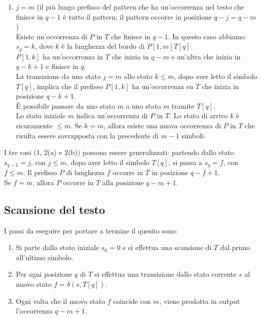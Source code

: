\begin{enumerate}
\begin{enumerate}
        \item $j = m$	(il più lungo prefisso del pattern che ha un’occorrenza nel testo che finisce in $q-1$ è tutto il pattern; il pattern occorre in posizione $q-j = q-m$)\\
        Esiste un’occorrenza di $P$ in $T$ che finisce in $q-1$. In questo caso abbiamo $s_q = k$, dove $k$ è la lunghezza del bordo di $P[1,m]T[q]$\\
        $P[1,k]$ ha un’occorrenza in $T$ che inizia in $q-m$ e un’altra che inizia in $q-k+1$ e finisce in $q$. \\
        La transizione da uno stato $j=m$ allo stato $k \leq m$, dopo aver letto il simbolo $T[q]$, implica che il prefisso $P[1,k]$ ha un’occorrenza su $T$ che inizia in posizione $q-k+1$.\\
        
        È possibile passare da uno stato $m$ a uno stato $m$ tramite $T[q]$.\\
        Lo stato iniziale $m$ indica un’occorrenza di $P$ in $T$. Lo stato di arrivo $k$ è sicuramente $\leq m$. Se $k=m$, allora esiste una nuova occorrenza di $P$ in $T$ che risulta essere sovrapposta con la precedente di $m-1$ simboli.
        \end{enumerate} 
\end{enumerate}

I tre casi (1, 2(a) e 2(b)) possono essere generalizzati: partendo dallo stato $s_{q-1} = j$, con $j \leq m$, dopo aver letto il simbolo $T[q]$, si passa a $s_{q} = f$, con $f \leq m$.
Il prefisso $P$ di lunghezza $f$ occorre in $T$ in posizione $q-f+1$.\\
Se $f=m$, allora $P$ occorre in $T$ alla posizione $q-m+1$.

\subsection{Scansione del testo}
I passi da eseguire per portare a termine il quesito sono:
\begin{enumerate}
    \item Si parte dallo stato iniziale $s_0=0$ e si effettua una scansione di $T$ dal primo all’ultimo simbolo. 
    \item Per ogni posizione $q$ di $T$ si effettua una transizione dallo stato corrente $s$ al nuovo stato $f=\delta(s, T[q])$.
    \item Ogni volta che il nuovo stato $f$ coincide con $m$, viene prodotta in output l’occorrenza $q-m+1$.
\end{enumerate}

